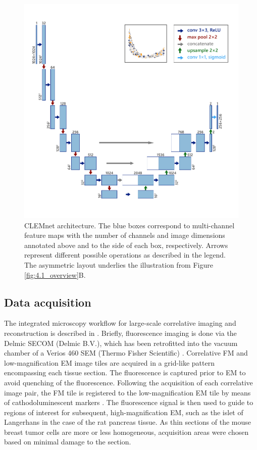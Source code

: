 \begin{figure}[!tb]
    \centering
    \includegraphics[width=0.95\linewidth]{chapter-4/figures_PDF/fig4-M1_architecture.pdf}
    \caption{CLEMnet architecture.
    The blue boxes correspond to multi-channel feature maps with the number of channels and image dimensions annotated above and to the side of each box, respectively. Arrows represent different possible operations as described in the legend. The asymmetric layout underlies the illustration from Figure \ref{fig:4.1_overview}B.}
    \label{fig:4M_architecture}
\end{figure}


\subsection{Data acquisition}
\label{sec:4methods_acquisition}
The integrated microscopy workflow for large-scale correlative imaging and reconstruction is described in \textcite{lane2021integrated}. Briefly, fluorescence imaging is done via the Delmic SECOM (Delmic B.V.), which has been retrofitted into the vacuum chamber of a Verios 460 SEM (Thermo Fisher Scientific) \cite{liv2013simultaneous, zonnevylle2013integration}. Correlative FM and low-magnification EM image tiles are acquired in a grid-like pattern encompassing each tissue section. The fluorescence is captured prior to EM to avoid quenching of the fluorescence. Following the acquisition of each correlative image pair, the FM tile is registered to the low-magnification EM tile by means of cathodoluminescent markers \cite{haring2017automated}. The fluorescence signal is then used to guide to regions of interest for subsequent, high-magnification EM, such as the islet of Langerhans in the case of the rat pancreas tissue. As thin sections of the mouse breast tumor cells are more or less homogeneous, acquisition areas were chosen based on minimal damage to the section. 

